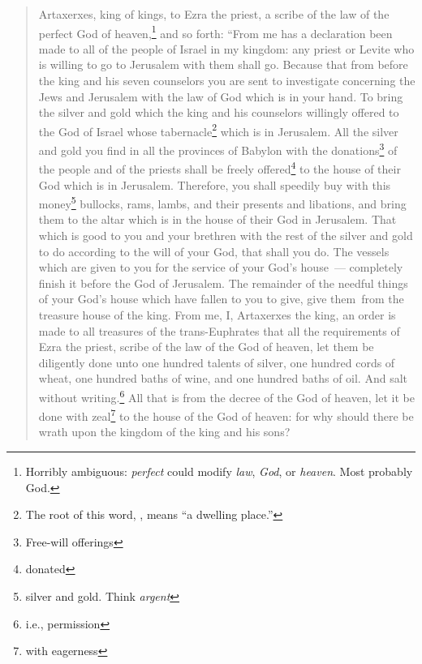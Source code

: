 \begin{quote}
    \begin{inparaenum}\setcounter{enumi}{11}
         Artaxerxes, king of kings, to Ezra the priest, a scribe of the law of the perfect God of heaven,\footnote{Horribly ambiguous: \textit{perfect} could modify \textit{law}, \textit{God}, or \textit{heaven}. Most probably God.} and so forth:%
         ``From me has a declaration been made to all of the people of Israel in my kingdom: any priest or Levite who is willing to go to Jerusalem with them shall go.%
         Because that from before the king and his seven counselors you are sent to investigate concerning the Jews and Jerusalem with the law of God which is in your hand.%
         To bring the silver and gold which the king and his counselors willingly offered to the God of Israel whose tabernacle\footnote{The root of this word, , means ``a dwelling place.''} which is in Jerusalem.%
         All the silver and gold you find in all the provinces of Babylon with the donations\footnote{Free-will offerings} of the people and of the priests shall be freely offered\footnote{donated} to the house of their God which is in Jerusalem.%
         Therefore, you shall speedily buy with this money\footnote{silver and gold. Think \textit{argent}} bullocks, rams, lambs, and their presents and libations, and bring them to the altar which is in the house of their God in Jerusalem.%
         That which is good to you and your brethren with the rest of the silver and gold to do according to the will of your God, that shall you do.%
         The vessels which are given to you for the service of your God's house~--- completely finish it before the God of Jerusalem.%
         The remainder of the needful things of your God's house which have fallen to you to give, give them\understood\ from the treasure house of the king.%
         From me, I, Artaxerxes the king, an order is made to all treasures of the trans-Euphrates that all the requirements of Ezra the priest, scribe of the law of the God of heaven, let them be diligently done%
         unto one hundred talents of silver, one hundred cords of wheat, one hundred baths of wine, and one hundred baths of oil. And salt without writing.\footnote{i.e., permission}%
         All that is from the decree of the God of heaven, let it be done with zeal\footnote{with eagerness} to the house of the God of heaven: for why should there be wrath upon the kingdom of the king and his sons?%

\end{inparaenum}
\end{quote}

